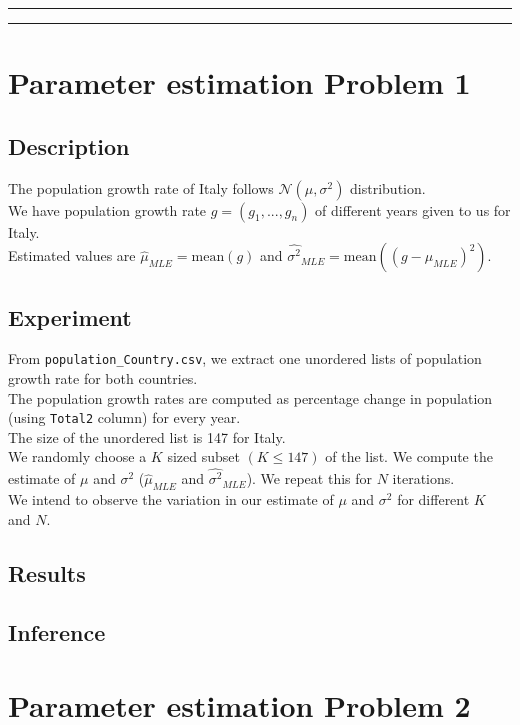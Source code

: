 \documentclass[fleqn, 11pt]{article}
\newcommand{\myline}{
    \par
    \kern3pt %
    \hrule height 0.5pt
    \kern2pt %
    \hrule height 0.5pt
    \kern3pt %
    \par
}
\begin{document}
\vspace{7pt}

\myline

\newpage
\section{Parameter estimation Problem 1}
\subsection{Description}

The population growth rate of Italy follows $\mathcal{N}(\mu, \sigma^2)$ distribution. \\
We have population growth rate $g = (g_1, ..., g_n)$ of different years given to us for Italy. \\
Estimated values are $\hat{\mu}_{MLE} = \mathrm{mean}(g)$ and $\hat{\sigma^2}_{MLE} = \mathrm{mean}((g - \hat{\mu}_{MLE})^2)$.

\subsection{Experiment}
From \verb!population_Country.csv!, we extract one unordered lists of population growth rate for both countries. \\
The population growth rates are computed as percentage change in population (using \verb!Total2! column) for every year. \\
The size of the unordered list is 147 for Italy. \\
We randomly choose a $K$ sized subset $(K \le 147)$ of the list. We compute the estimate of $\mu$ and $\sigma^2$ ($\hat{\mu}_{MLE}$ and $\hat{\sigma^2}_{MLE}$). We repeat this for $N$ iterations. \\
We intend to observe the variation in our estimate of $\mu$ and $\sigma^2$ for different $K$ and $N$.

\subsection{Results}


\subsection{Inference}


\newpage
\section{Parameter estimation Problem 2}
\end{document}
